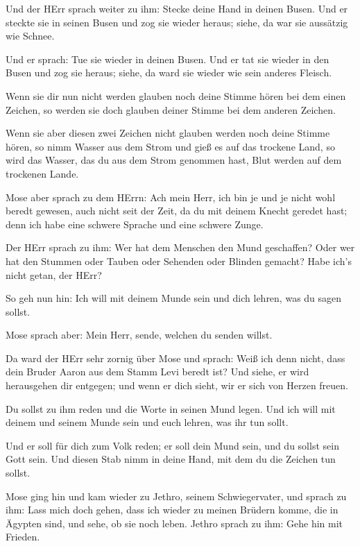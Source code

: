  Und der HErr sprach weiter zu ihm: Stecke deine Hand in
deinen Busen. Und er steckte sie in seinen Busen und zog sie wieder
heraus; siehe, da war sie aussätzig wie Schnee.

 Und er sprach: Tue sie wieder in deinen Busen. Und er tat
sie wieder in den Busen und zog sie heraus; siehe, da ward sie wieder
wie sein anderes Fleisch.

 Wenn sie dir nun nicht werden glauben noch deine Stimme
hören bei dem einen Zeichen, so werden sie doch glauben deiner Stimme
bei dem anderen Zeichen.

 Wenn sie aber diesen zwei Zeichen nicht glauben werden noch
deine Stimme hören, so nimm Wasser aus dem Strom und gieß es auf das
trockene Land, so wird das Wasser, das du aus dem Strom genommen hast,
Blut werden auf dem trockenen Lande.

 Mose aber sprach zu dem HErrn: Ach mein Herr, ich bin je
und je nicht wohl beredt gewesen, auch nicht seit der Zeit, da du mit
deinem Knecht geredet hast; denn ich habe eine schwere Sprache und eine
schwere Zunge.

 Der HErr sprach zu ihm: Wer hat dem Menschen den Mund
geschaffen? Oder wer hat den Stummen oder Tauben oder Sehenden oder
Blinden gemacht? Habe ich's nicht getan, der HErr?

 So geh nun hin: Ich will mit deinem Munde sein und dich
lehren, was du sagen sollst.

 Mose sprach aber: Mein Herr, sende, welchen du senden
willst.

 Da ward der HErr sehr zornig über Mose und sprach: Weiß
ich denn nicht, dass dein Bruder Aaron aus dem Stamm Levi beredt ist?
Und siehe, er wird herausgehen dir entgegen; und wenn er dich sieht, wir
er sich von Herzen freuen.

 Du sollst zu ihm reden und die Worte in seinen Mund legen.
Und ich will mit deinem und seinem Munde sein und euch lehren, was ihr
tun sollt.

 Und er soll für dich zum Volk reden; er soll dein Mund
sein, und du sollst sein Gott sein.  Und diesen Stab nimm
in deine Hand, mit dem du die Zeichen tun sollst.

 Mose ging hin und kam wieder zu Jethro, seinem
Schwiegervater, und sprach zu ihm: Lass mich doch gehen, dass ich wieder
zu meinen Brüdern komme, die in Ägypten sind, und sehe, ob sie noch
leben. Jethro sprach zu ihm: Gehe hin mit Frieden.

